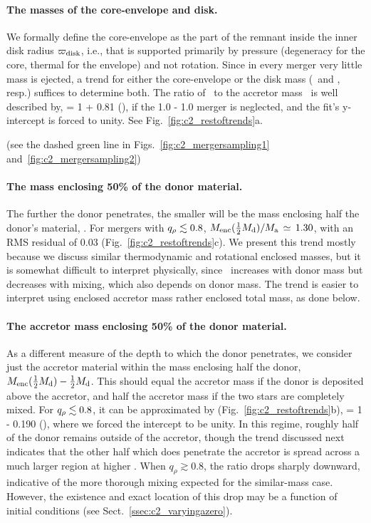 \paragraph{The masses of the core-envelope and disk.}  We formally define the core-envelope as the part of the remnant inside the inner disk radius $\varpi_\mathrm{disk}$, i.e., that is supported primarily by pressure (degeneracy for the core, thermal for the envelope) and not rotation.  Since in every merger very little mass is ejected, a trend for either the core-envelope or the disk mass (\Mrem\ and \Mdisk, resp.) suffices to determine both.  The ratio of \Mrem\ to the accretor mass \Ma\ is well described by,
\eqbegin
\frac{\Mrem}{\Ma} = 1 + 0.81\qrho
\qquad(),
\eqend
if the 1.0 - 1.0 {\Msun} merger is neglected, and the fit's y-intercept is forced to unity.  See Fig.~\ref{fig:c2_restoftrends}a.

(see the dashed green line in Figs.~\ref{fig:c2_mergersampling1} and~\ref{fig:c2_mergersampling2})

\paragraph{The mass enclosing 50\% of the donor material.}  The further the donor penetrates, the smaller will be the mass enclosing half the donor's material, \MMfifty.  For mergers with $\qrho\lesssim0.8$, $\MMfifty/\Ma\,\simeq\,1.30$, with an RMS residual of 0.03 (Fig.~\ref{fig:c2_restoftrends}c).  We present this trend mostly because we discuss similar thermodynamic and rotational enclosed masses, but it is somewhat difficult to interpret physically, since \MMfifty\ increases with donor mass but decreases with mixing, which also depends on donor mass.  The trend is easier to interpret using enclosed accretor mass rather enclosed total mass, as done below.

\paragraph{The accretor mass enclosing 50\% of the donor material.}  As a different measure of the depth to which the donor penetrates, we consider just the accretor material within the mass enclosing half the donor, $\MMfifty-\frac{1}{2}\Md$.  This should equal the accretor mass if the donor is deposited above the accretor, and half the accretor mass if the two stars are completely mixed.  For $\qrho\lesssim0.8$, it can be approximated by (Fig.~\ref{fig:c2_restoftrends}b),
\eqbegin
{} = 1 - 0.190\qrho
\qquad(),
\eqend
where we forced the intercept to be unity.  In this regime, roughly half of the donor remains outside of the accretor, though the trend discussed next indicates that the other half which does penetrate the accretor is spread across a much larger region at higher \qrho.  When $q_\rho\gtrsim0.8$, the ratio drops sharply downward, indicative of the more thorough mixing expected for the similar-mass case.  However, the existence and exact location of this drop may be a function of initial conditions (see Sect.~\ref{ssec:c2_varyingazero}).  

